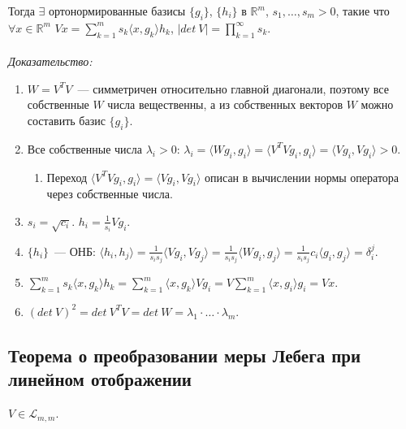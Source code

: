 \documentclass[paper=a4, fontsize=11pt]{article}
\begin{document}
Тогда $\exists$ ортонормированные базисы $\{g_i\}$, $\{h_i\}$ в $\mathds{R}^m$, $s_1,\dots,s_m > 0$, такие что
$\forall x \in \mathds{R}^m$ $Vx = \sum_{k=1}^m s_k \langle x,g_k \rangle h_k$,
$|det\ V| = \prod_{k=1}^{\infty} s_k$.
\\\\
\emph{Доказательство:}
\begin{enumerate}
    \item $W = V^TV$~--- симметричен относительно главной диагонали, поэтому все собственные $W$ числа вещественны,
    а из собственных векторов $W$ можно составить базис $\{g_i\}$.
    \item Все собственные числа $\lambda_i > 0$: $\lambda_i = \langle Wg_i,g_i \rangle = \langle V^TVg_i,g_i \rangle =
    \langle Vg_i,Vg_i \rangle > 0$.
    \begin{enumerate}
        \item Переход $\langle V^TVg_i,g_i \rangle = \langle Vg_i,Vg_i \rangle$ описан в вычислении нормы оператора
        через собственные числа.
    \end{enumerate}
    \item $s_i = \sqrt{c_i}$. $h_i = \frac{1}{s_i} V g_i$.
    \item $\{h_i\}$~--- ОНБ: $\langle h_i,h_j \rangle = \frac{1}{s_is_j} \langle Vg_i,Vg_j \rangle =
    \frac{1}{s_is_j} \langle Wg_i,g_j \rangle = \frac{1}{s_is_j} c_i \langle g_i,g_j \rangle = \delta_i^j$.
    \item $\sum_{k=1}^m s_k \langle x,g_k \rangle h_k = \sum_{k=1}^m \langle x,g_k \rangle Vg_i =
    V \sum_{k=1}^m \langle x,g_i \rangle g_i = Vx$.
    \item $(det\ V)^2 = det\ V^TV = det\ W = \lambda_1 \cdot \dots \cdot \lambda_m$.
\end{enumerate}

\subsection{Теорема о преобразовании меры Лебега при линейном отображении}
$V \in \mathscr{L}_{m,m}$.
\end{document}
